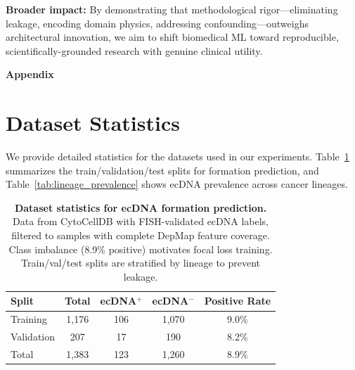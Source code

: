 \documentclass{article}
\begin{document}
\textbf{Broader impact:} By demonstrating that methodological rigor---eliminating leakage, encoding domain physics, addressing confounding---outweighs architectural innovation, we aim to shift biomedical ML toward reproducible, scientifically-grounded research with genuine clinical utility.


\newpage
\appendix

\begin{center}
\Large\textbf{Appendix}
\end{center}
\vspace{1em}

\section{Dataset Statistics}
\label{app:datasets}

We provide detailed statistics for the datasets used in our experiments. Table~\ref{tab:dataset_stats} summarizes the train/validation/test splits for formation prediction, and Table~\ref{tab:lineage_prevalence} shows ecDNA prevalence across cancer lineages.

\begin{table}[h]
\caption{\textbf{Dataset statistics for ecDNA formation prediction.} Data from CytoCellDB with FISH-validated ecDNA labels, filtered to samples with complete DepMap feature coverage. Class imbalance (8.9\% positive) motivates focal loss training. Train/val/test splits are stratified by lineage to prevent leakage.}
\label{tab:dataset_stats}
\centering
\small
\begin{tabular}{@{}lcccc@{}}
\toprule
Split & Total & ecDNA$^+$ & ecDNA$^-$ & Positive Rate \\
\midrule
Training & 1,176 & 106 & 1,070 & 9.0\% \\
Validation & 207 & 17 & 190 & 8.2\% \\
\midrule
Total & 1,383 & 123 & 1,260 & 8.9\% \\
\bottomrule
\end{tabular}
\end{table}
\end{document}
